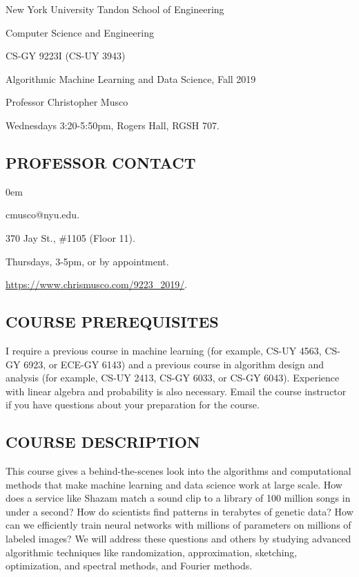 \documentclass[10pt]{article}
\begin{document}
	
\begin{center}
	\normalsize
	New York University Tandon School of Engineering
	
	Computer Science and Engineering
	\medskip
	
	\large
	CS-GY 9223I (CS-UY 3943)
	 
	Algorithmic Machine Learning and Data Science, Fall 2019
	\medskip
	
	\normalsize
	Professor Christopher Musco
	
	Wednesdays 3:20-5:50pm, Rogers Hall,  RGSH 707.
\end{center} 

\subsection{PROFESSOR CONTACT}
\begin{description}\itemsep0em 
	\item[Email:] cmusco@nyu.edu.
	\item[Office:] 370 Jay St., \#1105 (Floor 11).
	\item[Office Hours:] Thursdays, 3-5pm, or by appointment.
	\item[Course Webspage:] \url{https://www.chrismusco.com/9223_2019/}.
\end{description} 

\subsection{COURSE PREREQUISITES}
I require a previous course in machine learning (for example, CS-UY 4563, CS-GY 6923, or ECE-GY 6143) and a previous course in algorithm design and analysis (for example, CS-UY 2413, CS-GY 6033, or CS-GY 6043). Experience with linear algebra and probability is also necessary. Email the course instructor if you have questions about your preparation for the course.

\subsection{COURSE DESCRIPTION}
This course gives a behind-the-scenes look into the algorithms and computational methods that make machine learning and data science work at large scale. How does a service like Shazam match a sound clip to a library of 100 million songs in under a second? How do scientists find patterns in terabytes of genetic data? How can we efficiently train neural networks with millions of parameters on millions of labeled images? We will address these questions and others by studying advanced algorithmic techniques like randomization, approximation, sketching, optimization, and spectral methods, and Fourier methods. 
\end{document}

